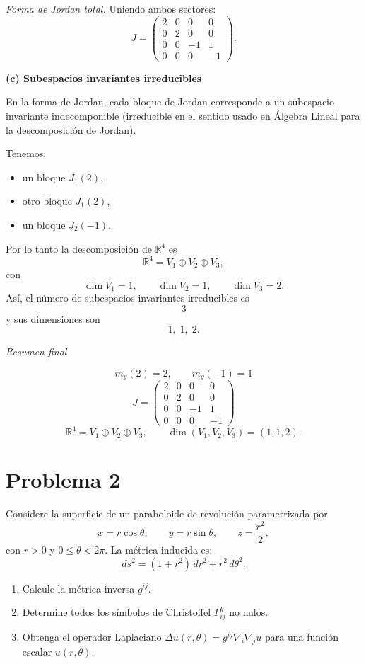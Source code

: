 \documentclass[12pt]{article}
\begin{document}
{\em Forma de Jordan total.}
Uniendo ambos sectores:
$$
\boxed{
J=
\begin{pmatrix}
2&0&0&0\\
0&2&0&0\\
0&0&-1&1\\
0&0&0&-1
\end{pmatrix}.
}
$$

{\bf (c) Subespacios invariantes irreducibles}

En la forma de Jordan, cada bloque de Jordan corresponde a un subespacio invariante indecomponible (irreducible en el sentido usado en Álgebra Lineal para la descomposición de Jordan).

Tenemos:
\begin{itemize}
\item un bloque $J_1(2)$,
\item otro bloque $J_1(2)$,
\item un bloque $J_2(-1)$.
\end{itemize}
Por lo tanto la descomposición de $\mathbb R^4$ es
$$
\mathbb R^4
=
V_1\oplus V_2\oplus V_3,
$$
con
$$
\dim V_1=1,\qquad
\dim V_2=1,\qquad
\dim V_3=2.
$$
Así, el número de subespacios invariantes irreducibles es
$$
\boxed{3}
$$
y sus dimensiones son
$$
\boxed{1,\;1,\;2.}
$$

{\em Resumen final}

$$
\boxed{m_g(2)=2,\qquad m_g(-1)=1}
$$
$$
\boxed{
J=
\begin{pmatrix}
2&0&0&0\\
0&2&0&0\\
0&0&-1&1\\
0&0&0&-1
\end{pmatrix}
}
$$
$$
\boxed{\mathbb R^4=V_1\oplus V_2\oplus V_3,\qquad
\dim(V_1,V_2,V_3)=(1,1,2).}
$$







\section*{Problema 2}
Considere la superficie de un paraboloide de revolución parametrizada por
\[
x = r \cos \theta, \qquad y = r \sin \theta, \qquad z = \frac{r^2}{2},
\]
con \(r > 0\) y \(0 \le \theta < 2\pi\). La métrica inducida es:
\[
ds^2 = (1 + r^2)\,dr^2 + r^2\,d\theta^2.
\]
\begin{enumerate}
    \item[(a)] Calcule la métrica inversa \(g^{ij}\).
    \item[(b)] Determine todos los símbolos de Christoffel \(\Gamma^k_{ij}\) no nulos.
    \item[(c)] Obtenga el operador Laplaciano \(\Delta u(r, \theta) = g^{ij}\nabla_i\nabla_j u\) para una función escalar \(u(r, \theta)\).
\end{enumerate}
\end{document}
